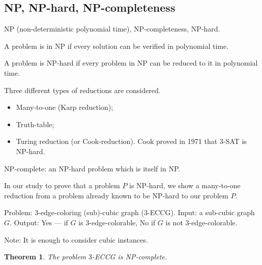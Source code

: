 \documentclass[12pt,a4paper]{article}
\newtheorem{theorem}{Theorem}
\begin{document}
\subsection{NP, NP-hard, NP-completeness}

NP (non-deterministic polynomial time), NP-completeness, NP-hard.

A problem is in NP if every solution can be verified in polynomial time.

A problem is NP-hard if every problem in NP can be reduced to it in polynomial
time.

Three different types of reductions are considered.
\begin{itemize}
\item Many-to-one (Karp reduction);
\item Truth-table;
\item Turing reduction (or Cook-reduction). Cook proved in 1971 that \(3\)-SAT
  is NP-hard.
\end{itemize}

NP-complete: an NP-hard problem which is itself in NP.\@

In our study to prove that a problem \(P\) is NP-hard, we show a many-to-one
reduction from a problem already known to be NP-hard to our problem \(P\).

Problem: \(3\)-edge-coloring (sub)-cubic graph (\(3\)-ECCG).
Input: a sub-cubic graph \(G\).
Output: Yes --- if \(G\) is \(3\)-edge-colorable, No if \(G\) is not
\(3\)-edge-colorable.

Note: It is enough to consider cubic instances.

\begin{theorem}
  The problem \(3\)-ECCG is NP-complete.
\end{theorem}
\end{document}
